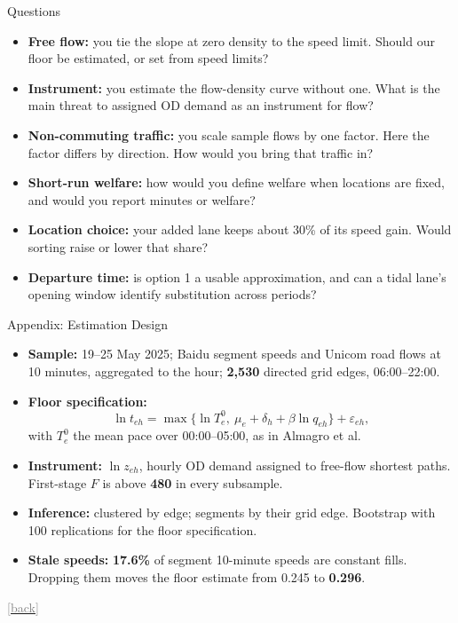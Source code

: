 \documentclass[11pt,aspectratio=169]{beamer}
\newcommand{\lead}[1]{{\color{Navy}\textbf{#1}}}
\newcommand{\backto}[1]{\par\vfill\hfill\hyperlink{#1}{\textcolor{gray}{\scriptsize[back]}}}
\begin{document}
\begin{frame}[label=m-questions]{Questions}
\footnotesize
\begin{itemize}\setlength\itemsep{.75em}
\item \lead{Free flow:} you tie the slope at zero density to the speed limit. Should our floor be estimated, or set from speed limits?
\item \lead{Instrument:} you estimate the flow-density curve without one. What is the main threat to assigned OD demand as an instrument for flow?
\item \lead{Non-commuting traffic:} you scale sample flows by one factor. Here the factor differs by direction. How would you bring that traffic in?
\item \lead{Short-run welfare:} how would you define welfare when locations are fixed, and would you report minutes or welfare?
\item \lead{Location choice:} your added lane keeps about 30\% of its speed gain. Would sorting raise or lower that share?
\item \lead{Departure time:} is option 1 a usable approximation, and can a tidal lane's opening window identify substitution across periods?
\end{itemize}
\end{frame}

\appendix

\begin{frame}[label=a-design]{Appendix: Estimation Design}
\footnotesize
\begin{itemize}
\item \lead{Sample:} 19--25 May 2025; Baidu segment speeds and Unicom road flows at 10 minutes, aggregated to the hour; \textbf{2,530} directed grid edges, 06:00--22:00.
\item \lead{Floor specification:}
\[
\ln t_{eh}=\max\{\ln T^0_e,\ \mu_e+\delta_h+\beta\ln q_{eh}\}+\varepsilon_{eh},
\]
with $T^0_e$ the mean pace over 00:00--05:00, as in Almagro et al.
\item \lead{Instrument:} $\ln z_{eh}$, hourly OD demand assigned to free-flow shortest paths. First-stage $F$ is above \textbf{480} in every subsample.
\item \lead{Inference:} clustered by edge; segments by their grid edge. Bootstrap with 100 replications for the floor specification.
\item \lead{Stale speeds:} \textbf{17.6\%} of segment 10-minute speeds are constant fills. Dropping them moves the floor estimate from 0.245 to \textbf{0.296}.
\end{itemize}
\backto{m-elasticity}
\end{frame}
\end{document}
